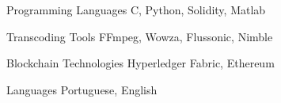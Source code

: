 

\begin{cvskills}

  \cvskill
    {Programming Languages} %
    {C, Python, Solidity, Matlab} %





  \cvskill
    {Transcoding Tools} %
    {FFmpeg, Wowza, Flussonic, Nimble} %

  \cvskill
    {Blockchain Technologies} %
    {Hyperledger Fabric, Ethereum} %

  \cvskill
    {Languages} %
    {Portuguese, English} %

\end{cvskills}